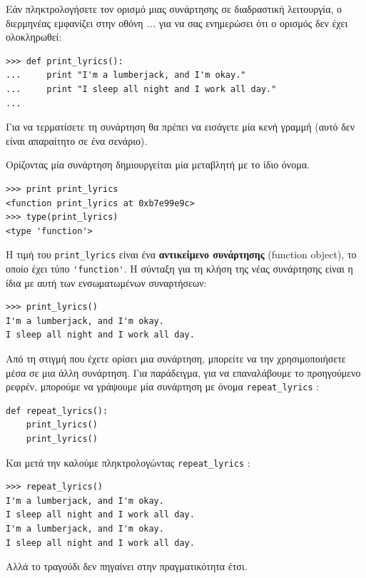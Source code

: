 \documentclass[10pt]{book}
\begin{document}
Εάν πληκτρολογήσετε τον ορισμό μιας συνάρτησης σε διαδραστική λειτουργία,
ο διερμηνέας εμφανίζει στην οθόνη {\em ...} για να σας ενημερώσει
ότι ο ορισμός δεν έχει ολοκληρωθεί:


\begin{verbatim}
>>> def print_lyrics():
...     print "I'm a lumberjack, and I'm okay."
...     print "I sleep all night and I work all day."
...
\end{verbatim}
%

Για να τερματίσετε τη συνάρτηση θα πρέπει να εισάγετε μία κενή
γραμμή (αυτό δεν είναι απαραίτητο σε ένα σενάριο).

Ορίζοντας μία συνάρτηση δημιουργείται μία μεταβλητή με το ίδιο
όνομα.


\begin{verbatim}
>>> print print_lyrics
<function print_lyrics at 0xb7e99e9c>
>>> type(print_lyrics)
<type 'function'>
\end{verbatim}
%

Η τιμή του  \verb"print_lyrics"  είναι ένα {\bf αντικείμενο συνάρτησης}
(function object), το οποίο έχει τύπο \verb"'function'".
Η σύνταξη για τη κλήση της νέας συνάρτησης είναι η ίδια με αυτή των
ενσωματωμένων συναρτήσεων:


\begin{verbatim}
>>> print_lyrics()
I'm a lumberjack, and I'm okay.
I sleep all night and I work all day.
\end{verbatim}
%

Από τη στιγμή που έχετε ορίσει μια συνάρτηση, μπορείτε να την χρησιμοποιήσετε
μέσα σε μια άλλη συνάρτηση. Για παράδειγμα, για να επαναλάβουμε το προηγούμενο
ρεφρέν, μπορούμε να γράψουμε μία συνάρτηση με όνομα \verb"repeat_lyrics" :


\begin{verbatim}
def repeat_lyrics():
    print_lyrics()
    print_lyrics()
\end{verbatim}
%

Και μετά την καλούμε πληκτρολογώντας  \verb"repeat_lyrics" :


\begin{verbatim}
>>> repeat_lyrics()
I'm a lumberjack, and I'm okay.
I sleep all night and I work all day.
I'm a lumberjack, and I'm okay.
I sleep all night and I work all day.
\end{verbatim}
%

Αλλά το τραγούδι δεν πηγαίνει στην πραγματικότητα έτσι.
\end{document}

